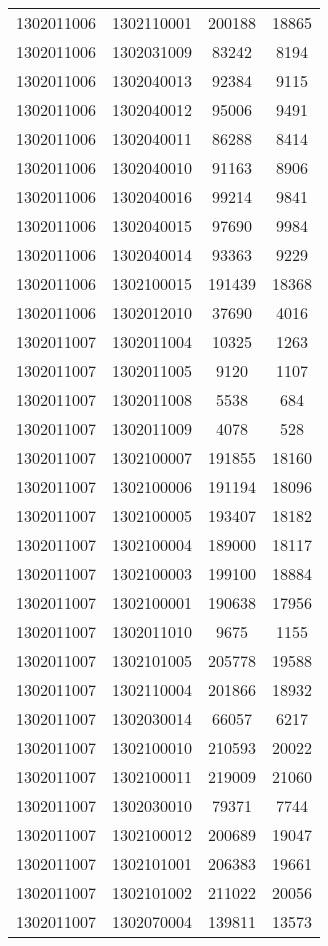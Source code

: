 \begin{longtable}[h]{llcc}
		1302011006 & 1302110001 & 200188 & 18865\\
		1302011006 & 1302031009 & 83242 & 8194\\
		1302011006 & 1302040013 & 92384 & 9115\\
		1302011006 & 1302040012 & 95006 & 9491\\
		1302011006 & 1302040011 & 86288 & 8414\\
		1302011006 & 1302040010 & 91163 & 8906\\
		1302011006 & 1302040016 & 99214 & 9841\\
		1302011006 & 1302040015 & 97690 & 9984\\
		1302011006 & 1302040014 & 93363 & 9229\\
		1302011006 & 1302100015 & 191439 & 18368\\
		1302011006 & 1302012010 & 37690 & 4016\\
		1302011007 & 1302011004 & 10325 & 1263\\
		1302011007 & 1302011005 & 9120 & 1107\\
		1302011007 & 1302011008 & 5538 & 684\\
		1302011007 & 1302011009 & 4078 & 528\\
		1302011007 & 1302100007 & 191855 & 18160\\
		1302011007 & 1302100006 & 191194 & 18096\\
		1302011007 & 1302100005 & 193407 & 18182\\
		1302011007 & 1302100004 & 189000 & 18117\\
		1302011007 & 1302100003 & 199100 & 18884\\
		1302011007 & 1302100001 & 190638 & 17956\\
		1302011007 & 1302011010 & 9675 & 1155\\
		1302011007 & 1302101005 & 205778 & 19588\\
		1302011007 & 1302110004 & 201866 & 18932\\
		1302011007 & 1302030014 & 66057 & 6217\\
		1302011007 & 1302100010 & 210593 & 20022\\
		1302011007 & 1302100011 & 219009 & 21060\\
		1302011007 & 1302030010 & 79371 & 7744\\
		1302011007 & 1302100012 & 200689 & 19047\\
		1302011007 & 1302101001 & 206383 & 19661\\
		1302011007 & 1302101002 & 211022 & 20056\\
		1302011007 & 1302070004 & 139811 & 13573\\

\end{longtable}
